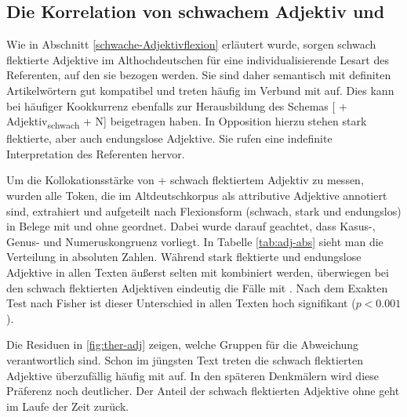 \subsection{Die Korrelation von schwachem Adjektiv und } \label{sec:ergeb-adjflex}

Wie in Abschnitt \ref{schwache-Adjektivflexion} erläutert wurde, sorgen schwach flektierte Adjektive im Althochdeutschen für eine individualisierende Lesart des Referenten, auf den sie bezogen werden. Sie sind daher semantisch mit definiten Artikelwörtern gut kompatibel und treten häufig im Verbund mit  auf. Dies kann bei häufiger Kookkurrenz ebenfalls zur Herausbildung des Schemas [ + Adjektiv\textsubscript{schwach} + N] beigetragen haben. In Opposition hierzu stehen stark flektierte, aber auch endungslose Adjektive. Sie rufen eine indefinite Interpretation des Referenten hervor. 

Um die Kollokationsstärke von  + schwach flektiertem Adjektiv zu messen, wurden alle Token, die im Altdeutschkorpus als attributive Adjektive annotiert sind, extrahiert und aufgeteilt nach Flexionsform (schwach, stark und endungslos) in Belege mit und ohne  geordnet. Dabei wurde darauf geachtet, dass Kasus-, Genus- und Numeruskongruenz vorliegt. In  Tabelle \ref{tab:adj-abs} sieht man die Verteilung in absoluten Zahlen. Während stark flektierte und endungslose Adjektive in allen Texten äußerst selten mit  kombiniert werden, überwiegen bei den schwach flektierten Adjektiven eindeutig die Fälle mit . Nach dem Exakten Test nach Fisher ist dieser Unterschied in allen Texten hoch signifikant ($p < 0.001$). 

Die Residuen in \ref{fig:ther-adj} zeigen, welche Gruppen für die Abweichung verantwortlich sind. Schon im jüngsten Text treten die schwach flektierten Adjektive überzufällig häufig mit  auf. In den späteren Denkmälern wird diese Präferenz noch deutlicher. Der Anteil der schwach flektierten Adjektive ohne  geht im Laufe der Zeit zurück. 


